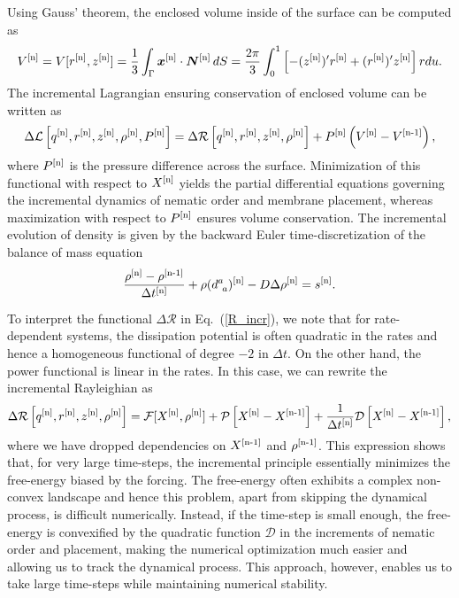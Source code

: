 Using Gauss' theorem, the enclosed volume inside of the surface can be computed as
\begin{equation}
V^{[\textup{n}]} = V[r^{[\textup{n}]}, z^{[\textup{n}]}] = \frac{1}{3}\int_\Gamma \bm{x}^{[\textup{n}]} \cdot \bm{N}^{[\textup{n}]}\,dS = \frac{2\pi}{3}\int_0^1 \left[-(z^{[\textup{n}]})' r^{[\textup{n}]} + (r^{[\textup{n}]})' z^{[\textup{n}]}\right] r du.
\end{equation}
The incremental Lagrangian ensuring conservation of enclosed volume can be written as 
\begin{equation}
\Delta \mathcal{L}\left[q^{[\textup{n}]}, r^{[\textup{n}]}, z^{[\textup{n}]}, \rho^{[\textup{n}]}, P^{[\textup{n}]}\right] = \Delta \mathcal{R}\left[q^{[\textup{n}]}, r^{[\textup{n}]}, z^{[\textup{n}]}, \rho^{[\textup{n}]}\right]  + P^{[\textup{n}]}\left(V^{[\textup{n}]}-V^{[\textup{n-1}]}\right),
\end{equation}
where $P^{[\textup{n}]}$ is the pressure difference across the surface. 
Minimization of this functional with respect to $X^{[\textup{n}]}$ yields the partial differential equations governing the incremental dynamics of nematic order and membrane placement, whereas maximization with respect to $P^{[\textup{n}]}$ ensures volume conservation. The incremental evolution of density is given by the backward Euler time-discretization of the balance of mass equation
\begin{equation}  \label{89_II_8n}
    \frac{\rho^{[\textup{n}]}-\rho^{[\textup{n-1}]}}{\Delta t^{[\textup{n}]}} + \rho (d_{~ a}^a)^{[\textup{n}]}   - D \Delta\rho^{[\textup{n}]}=  s^{[\textup{n}]}.
\end{equation}


To interpret the functional $\Delta \mathcal{R}$ in Eq.~(\ref{R_incr}), we note that for rate-dependent systems, the dissipation potential is often quadratic in the rates and hence a homogeneous functional of degree $-2$ in $\Delta t$. On the other hand, the power functional is linear in the rates. In this case, we can rewrite the incremental Rayleighian as
 \begin{equation}\label{R_incr}
\Delta \mathcal{R}\left[q^{[\textup{n}]}, r^{[\textup{n}]}, z^{[\textup{n}]}, \rho^{[\textup{n}]}\right] =  \mathcal{F}[X^{[\textup{n}]}, \rho^{[\textup{n}]}] + \mathcal{P}\left[X^{[\textup{n}]} - X^{[\textup{n-1}]}\right] +  \frac{1}{\Delta t^{[\textup{n}]}} \mathcal{D}\left[X^{[\textup{n}]} - X^{[\textup{n-1}]}\right],
\end{equation}
where we have dropped dependencies on $X^{[\textup{n-1}]}$ and $\rho^{[\textup{n-1}]}$.
This expression shows that, for very large time-steps, the incremental principle essentially minimizes the free-energy biased by the forcing. The free-energy often exhibits a complex non-convex landscape and hence this problem, apart from skipping the dynamical process, is difficult numerically. Instead, if the time-step is small enough, the free-energy is convexified by the quadratic function $\mathcal{D}$ in the increments of nematic order and placement, making the numerical optimization much easier and allowing us to track the dynamical process. This approach, however, enables us to take large time-steps while maintaining numerical stability.


